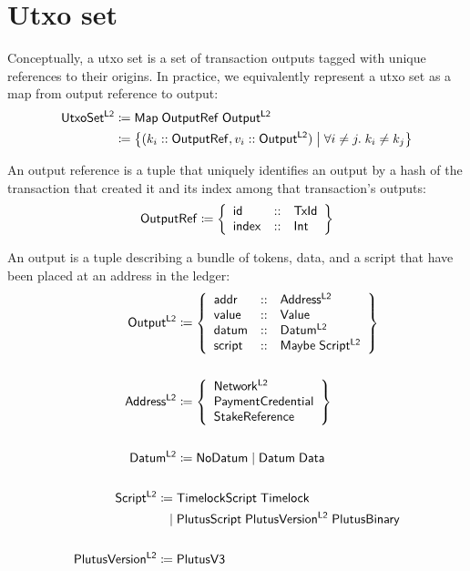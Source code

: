 \documentclass[../hydrozoa.tex]{subfiles}
\begin{document}
\section{Utxo set}%
\label{h:l2-utxo-set}%

Conceptually, a utxo set is a set of transaction outputs tagged with unique references to their origins.
In practice, we equivalently represent a utxo set as a map from output reference to output:
\begin{equation*}
\begin{split}
  \mathsf{UtxoSet^{L2}} &\coloneq \mathsf{Map} \; \mathsf{OutputRef} \; \mathsf{Output^{L2}} \\
    &\coloneq \left\{
      (k_i :: \mathsf{OutputRef}, v_i :: \mathsf{Output^{L2}})
      \;\middle|\;
      \forall i \neq j.\; k_i \neq k_j
    \right\}
\end{split}
\end{equation*}

An output reference is a tuple that uniquely identifies an output by a hash of the transaction that created it and its index among that transaction's outputs:
\begin{equation*}
  \mathsf{OutputRef} \coloneq \left\{
    \begin{array}{lll}
      \mathsf{id} &::& \mathsf{TxId} \\
        \mathsf{index} &::& \mathsf{Int}
    \end{array} \right\}
\end{equation*}

An output is a tuple describing a bundle of tokens, data, and a script that have been placed at an address in the ledger:
\begin{equation*}
\begin{split}
  \mathsf{Output^{L2}} &\coloneq \left\{
  \begin{array}{lll}
    \mathsf{addr} &::& \mathsf{Address^{L2}} \\
      \mathsf{value} &::& \mathsf{Value} \\
      \mathsf{datum} &::& \mathsf{Datum^{L2}} \\
      \mathsf{script} &::& \mathsf{Maybe} \; \mathsf{Script^{L2}}
  \end{array} \right\} \\\\
  \mathsf{Address^{L2}} &\coloneq \left\{
    \begin{array}{l}
      \mathsf{Network^{L2}} \\
      \mathsf{PaymentCredential} \\
      \mathsf{StakeReference}
    \end{array}\right\} \\\\
  \mathsf{Datum^{L2}} &\coloneq \mathsf{NoDatum} \mid \mathsf{Datum} \; \mathsf{Data} \\\\
  \mathsf{Script^{L2}} \coloneq\;& \mathsf{TimelockScript} \; \mathsf{Timelock} \\
                        \mid\;& \mathsf{PlutusScript} \; \mathsf{PlutusVersion^{L2}} \; \mathsf{PlutusBinary} \\\\
  \mathsf{PlutusVersion^{L2}} \coloneq\;& \mathsf{PlutusV3}
\end{split}
\end{equation*}
\end{document}
